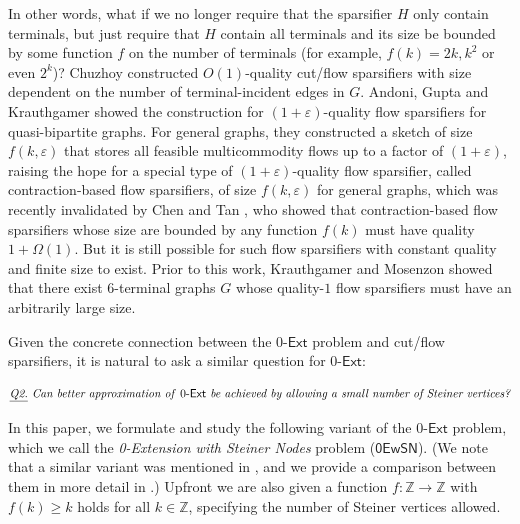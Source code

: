 \documentclass[11pt]{article}
\theoremstyle{definition}
\newcommand{\eps}{{\varepsilon}}
\newcounter{note}
\newcommand{\zesn}{\mathsf{0EwSN}}
\newcommand{\ze}{$0$-$\textsf{Ext}$\xspace}
\begin{document}
In other words, what if we no longer require that the sparsifier $H$ only contain terminals, but just require that $H$ contain all terminals and its size be bounded by some function $f$ on the number of terminals (for example, $f(k)=2k,k^2$ or even $2^k$)? 
Chuzhoy \cite{chuzhoy2012vertex} constructed $O(1)$-quality cut/flow sparsifiers with size dependent on the number of terminal-incident edges in $G$.
Andoni, Gupta and Krauthgamer \cite{andoni2014towards} showed the construction for $(1+\eps)$-quality flow sparsifiers for quasi-bipartite graphs. For general graphs, they constructed a sketch of size $f(k,\eps)$ that stores all feasible multicommodity flows up to a factor of $(1+\eps)$, raising the hope for a special type of $(1+\eps)$-quality flow sparsifier, called contraction-based flow sparsifiers, of size $f(k,\eps)$ for general graphs, which was recently invalidated by Chen and Tan \cite{chen20241+}, who showed that contraction-based flow sparsifiers whose size are bounded by any function $f(k)$ must have quality $1+\Omega(1)$. But it is still possible for such flow sparsifiers with constant quality and finite size to exist. Prior to this work, Krauthgamer and Mosenzon \cite{krauthgamer2023exact} showed that there exist $6$-terminal graphs $G$ whose quality-$1$ flow sparsifiers must have an arbitrarily large size.

Given the concrete connection between the \ze problem and  cut/flow sparsifiers, it is natural to ask a similar question for \ze: 

\vspace{-10pt}
\[\emph{\underline{Q2.} Can better approximation of \textnormal{\ze} be achieved by allowing a small number of Steiner vertices?}\]
\vspace{-10pt}

In this paper, we formulate and study the following variant of the \ze problem, which we call the \emph{0-Extension with Steiner Nodes} problem ($\zesn$). (We note that a similar variant was mentioned in \cite{andoni2014towards}, and we provide a comparison between them in more detail in .)
Upfront we are also given a function $f: \mathbb{Z}\to \mathbb{Z}$ with $f(k)\ge k$ holds for all $k\in \mathbb{Z}$, specifying the number of Steiner vertices allowed.

\vspace{-10pt}
\end{document}
